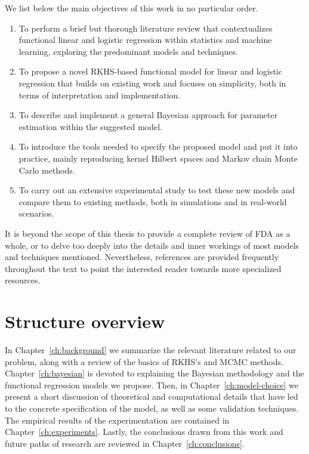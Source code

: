 We list below the main objectives of this work in no particular order.

\begin{enumerate}[1.]
  \item To perform a brief but thorough literature review that contextualizes functional linear and logistic regression within statistics and machine learning, exploring the predominant models and techniques.
  \item To propose a novel RKHS-based functional model for linear and logistic regression that builds on existing work and focuses on simplicity, both in terms of interpretation and implementation.
  \item To describe and implement a general Bayesian approach for parameter estimation within the suggested model.
  \item To introduce the tools needed to specify the proposed model and put it into practice, mainly reproducing kernel Hilbert spaces and Markov chain Monte Carlo methods.
  \item To carry out an extensive experimental study to test these new models and compare them to existing methods, both in simulations and in real-world scenarios.
\end{enumerate}

It is beyond the scope of this thesis to provide a complete review of FDA as a whole, or to delve too deeply into the details and inner workings of most models and techniques mentioned. Nevertheless, references are provided frequently throughout the text to point the interested reader towards more specialized resources.

\section{Structure overview}

In Chapter~\ref{ch:background} we summarize the relevant literature related to our problem, along with a review of the basics of RKHS's and MCMC methods. Chapter~\ref{ch:bayesian} is devoted to explaining the Bayesian methodology and the functional regression models we propose. Then, in Chapter~\ref{ch:model-choice} we present a short discussion of theoretical and computational details that have led to the concrete specification of the model, as well as some validation techniques. The empirical results of the experimentation are contained in Chapter~\ref{ch:experiments}. Lastly, the conclusions drawn from this work and future paths of research are reviewed in Chapter~\ref{ch:conclusions}.
